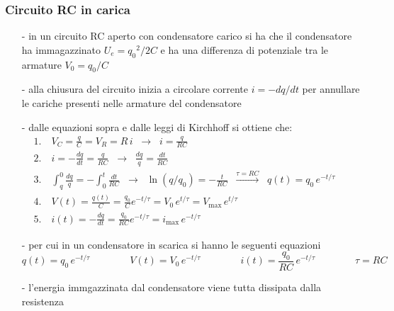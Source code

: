 \documentclass[a4paper]{article}
\begin{document}
\newpage

\subsubsection*{Circuito RC in carica}
\begin{itemize}
	\item[-] in un circuito RC aperto con condensatore carico si ha che il condensatore ha immagazzinato \(U_e = {q_0}^2 / 2C\) e
	ha una differenza di potenziale tra le armature \(V_0 = q_0/C\)
	\item[-] alla chiusura del circuito inizia a circolare corrente \(i = - dq/dt\) per annullare le cariche presenti nelle armature
	del condensatore
	\item[-] dalle equazioni sopra e dalle leggi di Kirchhoff si ottiene che:
	\begin{align*}
		&1. \quad V_C = \frac{q}{C} = V_R = R \, i \;\;\rightarrow\;\; i = \frac{q}{RC} \\
		&2. \quad i = - \frac{dq}{dt} = \frac{q}{RC} \;\;\rightarrow\;\; \frac{dq}{q} = \frac{dt}{RC} \\
		&3. \quad \int_q^0 \frac{dq}{q} = - \int_0^t \frac{dt}{RC} \;\;\rightarrow\;\; \ln(q/q_0) = -\frac{t}{RC} \;\;\stackrel{\tau = RC}{\rightarrow}\;\; q(t) = q_0 \, e^{-t/\tau} \\
		&4. \quad V(t) = \frac{q(t)}{C} = \frac{q_0}{C} e^{-t/\tau} = V_0 \, e^{t/\tau} = V_\text{max} \, e^{t/\tau} \\
		&5. \quad i(t) = -\frac{dq}{dt} = \frac{q_0}{RC}e^{-t/\tau} = i_\text{max} \, e^{-t/\tau} \qquad\qquad\qquad\qquad\qquad\qquad\qquad\qquad\qquad
	\end{align*}
	\item[-] per cui in un condensatore in scarica si hanno le seguenti equazioni
	\[q(t) = q_0 \, e^{-t/\tau} \qquad \qquad V(t) = V_0 \, e^{-t/\tau} \qquad \qquad i(t) = \frac{q_0}{RC} \, e^{-t/\tau} \qquad \qquad \tau = RC\]
	\item[-] l'energia immgazzinata dal condensatore viene tutta dissipata dalla resistenza
\end{itemize}
\end{document}
